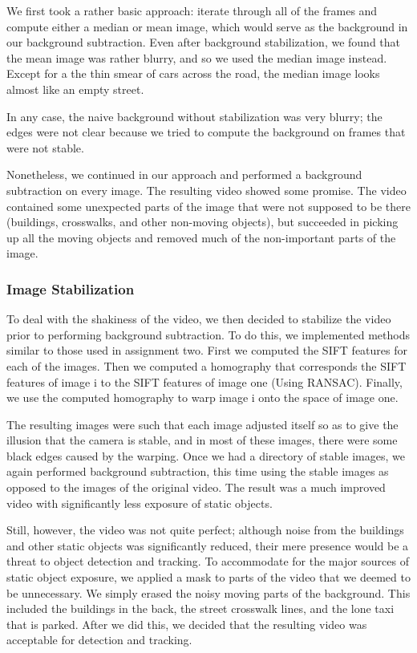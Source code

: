 \documentclass[a4paper, 10pt, conference]{ieeeconf}      %
\begin{document}
We first took a rather basic approach: iterate through all of the frames and compute either a median or mean image, which would serve as the background in our background subtraction. Even after background stabilization, we found that the mean image was rather blurry, and so we used the median image instead. Except for a the thin smear of cars across the road, the median image looks almost like an empty street. \newline

In any case, the naive background without stabilization was very blurry; the edges were not clear because we tried to compute the background on frames that were not stable. \newline

Nonetheless, we continued in our approach and performed a background subtraction on every image. The resulting video showed some promise. The video contained some unexpected parts of the image that were not supposed to be there (buildings, crosswalks, and other non-moving objects), but succeeded in picking up all the moving objects and removed much of the non-important parts of the image. \newline


\subsubsection{Image Stabilization}

To deal with the shakiness of the video, we then decided to stabilize the video prior to performing background subtraction. To do this, we implemented methods similar to those used in assignment two. First we computed the SIFT features for each of the images. Then we computed a homography that corresponds the SIFT features of image i to the SIFT features of image one (Using RANSAC). Finally, we use the computed homography to warp image i onto the space of image one. \newline

The resulting images were such that each image adjusted itself so as to give the illusion that the camera is stable, and in most of these images, there were some black edges caused by the warping. Once we had a directory of stable images, we again performed background subtraction, this time using the stable images as opposed to the images of the original video. The result was a much improved video with significantly less exposure of static objects. \newline

Still, however, the video was not quite perfect; although noise from the buildings and other static objects was significantly reduced, their mere presence would be a threat to object detection and tracking. To accommodate for the major sources of static object exposure, we applied a mask to parts of the video that we deemed to be unnecessary. We simply erased the noisy moving parts of the background. This included the buildings in the back, the street crosswalk lines, and the lone taxi that is parked. After we did this, we decided that the resulting video was acceptable for detection and tracking.\newline
\end{document}
